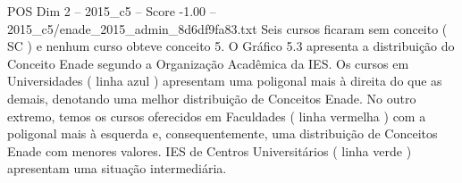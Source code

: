 \begin{textsample}{POS Dim 2 – 2015\_c5 – Score -1.00 – 2015\_c5/enade\_2015\_admin\_8d6df9fa83.txt}
Seis cursos ficaram sem conceito ( SC ) e nenhum curso obteve conceito 5.
O Gráfico 5.3 apresenta a distribuição do Conceito Enade segundo a Organização Acadêmica da IES.
Os cursos em Universidades ( linha azul ) apresentam uma poligonal mais à direita do que as demais, denotando uma melhor distribuição de Conceitos Enade.
No outro extremo, temos os cursos oferecidos em Faculdades ( linha vermelha ) com a poligonal mais à esquerda e, consequentemente, uma distribuição de Conceitos Enade com menores valores.
IES de Centros Universitários ( linha verde ) apresentam uma situação intermediária.

\end{textsample}
